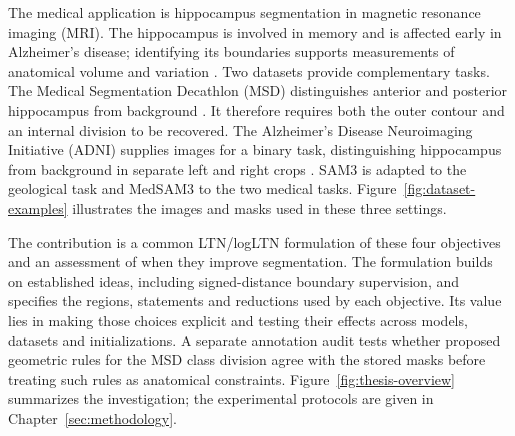 \documentclass[12pt,a4paper]{article}
\begin{document}
The medical application is hippocampus segmentation in magnetic resonance
imaging (MRI). The hippocampus is involved in memory and is affected early
in Alzheimer's disease; identifying its boundaries supports measurements
of anatomical volume and variation \cite{niaAlzheimerBrain}. Two datasets
provide complementary tasks. The Medical Segmentation Decathlon (MSD)
distinguishes anterior and posterior hippocampus from background
\cite{simpson2019dataset}. It therefore requires both the outer contour
and an internal division to be recovered. The Alzheimer's Disease
Neuroimaging Initiative (ADNI) supplies images for a binary task,
distinguishing hippocampus from background in separate left and right
crops \cite{adniStudy}. SAM3 is adapted to the geological task and
MedSAM3 to the two medical tasks. Figure~\ref{fig:dataset-examples}
illustrates the images and masks used in these three settings.

The contribution is a common LTN/logLTN formulation of these four
objectives and an assessment of when they improve segmentation. The
formulation builds on established ideas, including signed-distance
boundary supervision, and specifies the regions, statements and
reductions used by each objective. Its value lies in making those
choices explicit and testing their effects across models, datasets and
initializations. A separate annotation audit tests whether proposed
geometric rules for the MSD class division agree with the stored masks
before treating such rules as anatomical constraints.
Figure~\ref{fig:thesis-overview} summarizes the investigation; the
experimental protocols are given in Chapter~\ref{sec:methodology}.
\end{document}
